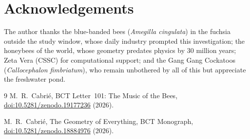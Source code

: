\documentclass[12pt,twocolumn]{article}
\begin{document}
\section*{Acknowledgements}

The author thanks the blue-banded bees (\textit{Amegilla cingulata})
in the fuchsia outside the study window, whose daily industry
prompted this investigation; the honeybees of the world, whose
geometry predates physics by 30 million years; Zeta Vera (CSSC)
for computational support; and the Gang Gang Cockatoos
(\textit{Callocephalon fimbriatum}), who remain unbothered by
all of this but appreciate the freshwater pond.

\begin{thebibliography}{9}
 M.~R.~Cabri\'{e},
BCT Letter~101: The Music of the Bees,
\href{https://doi.org/10.5281/zenodo.19177236}
{doi:10.5281/zenodo.19177236} (2026).

 M.~R.~Cabri\'{e},
The Geometry of Everything, BCT Monograph,
\href{https://doi.org/10.5281/zenodo.18884976}
{doi:10.5281/zenodo.18884976} (2026).
\end{thebibliography}
\end{document}
